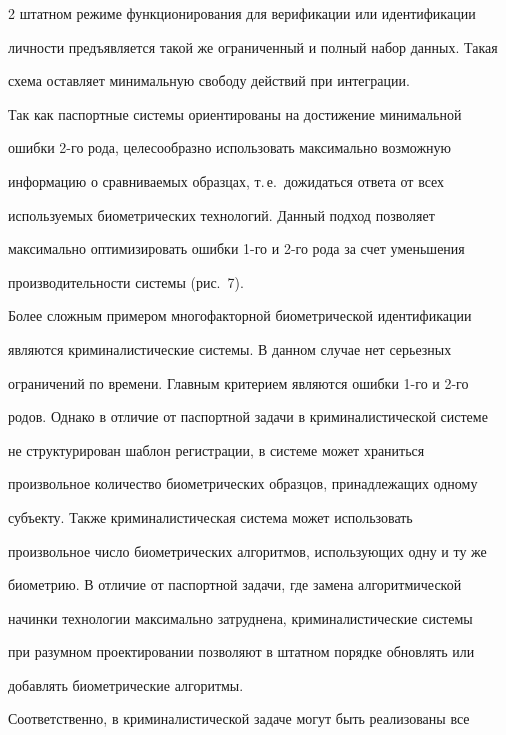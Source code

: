 \begin{multicols}{2}
штатном режиме функционирования для верификации или идентификации 

личности предъявляется такой же ограниченный и полный набор данных. Такая 

схема оставляет минимальную свободу действий при интеграции. 



 

  Так как паспортные системы ориентированы на достижение минимальной 

ошибки 2-го рода, целесообразно использовать максимально возможную 

информацию о сравниваемых образцах, т.\,е.\ дожидаться ответа от всех 

используемых биометрических технологий. Данный подход позволяет 

максимально оптимизировать ошибки 1-го и 2-го рода за счет уменьшения 

производительности системы (рис.~7).

{ %



}

 

  Более сложным примером многофакторной биометрической идентификации 

являются криминалистические системы. В данном случае нет серь\-ез\-ных 

ограничений по времени. Главным критерием являются ошибки 1-го и 2-го 

родов. Однако в отличие от паспортной задачи в криминалистической системе 

не структурирован шаблон регистрации, в системе может храниться 

произвольное коли\-че\-ст\-во биометрических образцов, принадлежащих одному 

субъекту. Также криминалистическая система может использовать

произвольное число био\-мет\-ри\-че\-ских алгоритмов, использующих одну и ту же 

биометрию. В отличие от паспортной задачи, где замена алгоритмической 

начинки технологии максимально затруднена, криминалистические сис\-те\-мы 

при разумном проектировании позволяют в штатном порядке обновлять или 

добавлять био\-мет\-ри\-че\-ские алгоритмы.

  

  Соответственно, в криминалистической задаче могут быть реализованы все 


\end{multicols}
